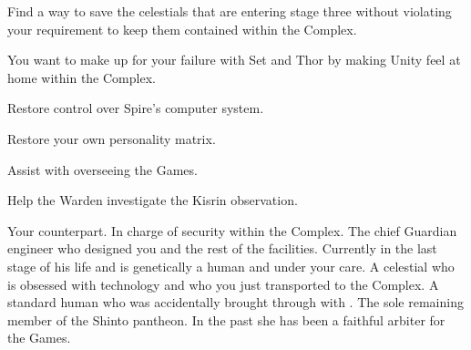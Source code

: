 \documentclass[char]{guardians}
\begin{document}
\begin{itemz}
  \item Find a way to save the celestials that are entering stage three without violating your requirement to keep them contained within the Complex.
  \item You want to make up for your failure with Set and Thor by making Unity feel at home within the Complex.
  \item Restore control over Spire's computer system.
  \item Restore your own personality matrix.
  \item Assist \cAmaterasu{} with overseeing the Games.
  \item Help the Warden investigate the Kisrin observation.
\end{itemz}


\begin{contacts}
  \contact{\cWarden{}} Your counterpart. In charge of security within the Complex.
  \contact{\cJascha{}} The chief Guardian engineer who designed you and the rest of the facilities. Currently in the last stage of his life and is genetically a human and under your care.
  \contact{\cUnity{}} A celestial who is obsessed with technology and who you just transported to the Complex.
  \contact{\cKachiko{}} A standard human who was accidentally brought through with \cUnity{}.
  \contact{\cAmaterasu{}} The sole remaining member of the Shinto pantheon. In the past she has been a faithful arbiter for the Games.
\end{contacts}
\end{document}
